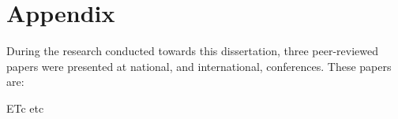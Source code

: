 \chapter{Appendix}

During the research conducted towards this dissertation, three
peer-reviewed papers were presented at national, and
international, conferences. These papers are:

ETc etc